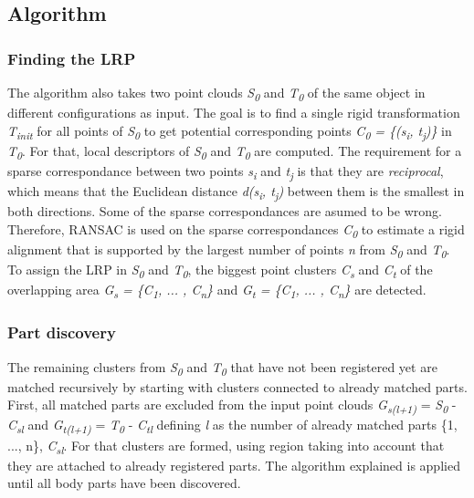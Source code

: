 \documentclass[notitlepage,english]{report}
\begin{document}
\subsection{Algorithm} 

\subsubsection{Finding the LRP}

The algorithm also takes two point clouds \textit{S\textsubscript{0}} and \textit{T\textsubscript{0}} of the same object in different configurations as input.
The goal is to find a single rigid transformation \textit{T\textsubscript{init}} for all points of \textit{S\textsubscript{0}} to get potential corresponding points \textit{C\textsubscript{0} = \{(s\textsubscript{i}, t\textsubscript{j})\}} in \textit{T\textsubscript{0}}. For that, local descriptors of \textit{S\textsubscript{0}} and \textit{T\textsubscript{0}} are computed. The requirement for a sparse correspondance between two points \textit{s\textsubscript{i}} and \textit{t\textsubscript{j}}  is that they are \textit{reciprocal}, which means that the Euclidean distance \textit{d(s\textsubscript{i}, t\textsubscript{j})} between them is the smallest in both directions. Some of the sparse correspondances are asumed to be wrong. Therefore, RANSAC is used on the sparse correspondances \textit{C\textsubscript{0}} to estimate a rigid alignment that is supported by the largest number of points \textit{n} from \textit{S\textsubscript{0}} and \textit{T\textsubscript{0}}. To assign the LRP in \textit{S\textsubscript{0}} and \textit{T\textsubscript{0}}, the biggest point clusters \textit{C\textsubscript{s}} and \textit{C\textsubscript{t}} of the overlapping area \textit{G\textsubscript{s} = \{C\textsubscript{1}, ... , C\textsubscript{n}\} } and \textit{G\textsubscript{t} = \{C\textsubscript{1}, ... , C\textsubscript{n}\} } are detected. 


\subsubsection{Part discovery}

The remaining clusters from \textit{S\textsubscript{0}} and \textit{T\textsubscript{0}} that have not been registered yet are matched recursively by starting with clusters connected to already matched parts. First, all matched parts are excluded from the input point clouds  \textit{G\textsubscript{s(l+1)}} = \textit{S\textsubscript{0}} - \textit{C\textsubscript{sl}} and \textit{G\textsubscript{t(l+1)}} = \textit{T\textsubscript{0}} - \textit{C\textsubscript{tl}} defining \textit{l} as the number of already matched parts \{1, ..., n\}, \textit{C\textsubscript{sl}}. For that clusters are formed, using region taking into account that they are attached to already registered parts. The algorithm explained is applied until all body parts have been discovered.
\end{document}
